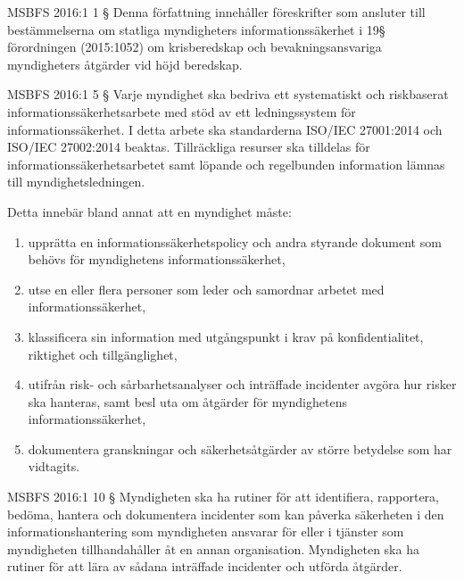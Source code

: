 \documentclass{beamer}
\begin{document}
\begin{frame}{MSBFS 2016:1}
  1 §  Denna författning innehåller föreskrifter som ansluter till
  bestämmelserna om statliga myndigheters informationssäkerhet i 19§
  förordningen (2015:1052) om krisberedskap och bevakningsansvariga
  myndigheters åtgärder vid höjd beredskap. 
\end{frame}

\begin{frame}{MSBFS 2016:1}
  \footnotesize
  5 §  Varje myndighet ska bedriva ett systematiskt och riskbaserat
  informationssäkerhetsarbete med stöd av ett ledningssystem för
  informationssäkerhet. I detta arbete ska standarderna ISO/IEC 27001:2014 och
  ISO/IEC 27002:2014 beaktas. Tillräckliga resurser ska tilldelas för
  informationssäkerhetsarbetet samt löpande och regelbunden information lämnas
  till myndighetsledningen.

  Detta innebär bland annat att en myndighet måste:
  \begin{enumerate}
    \item upprätta en informationssäkerhetspolicy och andra styrande dokument
      som behövs för myndighetens informationssäkerhet,
    \item utse en eller flera personer som leder och samordnar arbetet med
      informationssäkerhet,
    \item klassificera sin information med utgångspunkt i krav på
      konfidentialitet, riktighet och tillgänglighet,
    \item utifrån risk- och sårbarhetsanalyser och inträffade incidenter
      avgöra hur risker ska hanteras, samt besl uta om åtgärder för
      myndighetens informationssäkerhet,
    \item dokumentera granskningar och säkerhetsåtgärder av större betydelse
      som har vidtagits.
  \end{enumerate}
\end{frame}

\begin{frame}{MSBFS 2016:1}
  10 § Myndigheten ska ha rutiner för att identifiera, rapportera, bedöma,
  hantera och dokumentera incidenter som kan påverka säkerheten i den
  informationshantering som myndigheten ansvarar för eller i tjänster som
  myndigheten tillhandahåller åt en annan organisation. Myndigheten ska ha
  rutiner för att lära av sådana inträffade incidenter och utförda åtgärder.
\end{frame}
\end{document}
